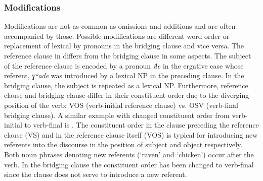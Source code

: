\documentclass[output=paper]{LSP/langsci}
\begin{document}
\subsubsection{Modifications}
\label{ssec:Modifications}
Modifications are not as common as omissions and additions and are often accompanied by those. Possible modifications are different word order or replacement of lexical  by pronouns in the bridging clause and vice versa. The reference clause in  differs from the bridging clause in some aspects. The subject of the reference clause is encoded by a pronoun \textit{iɬe} in the ergative case whose referent, \textit{ɣʷade}  was introduced by a lexical NP in the preceding clause. In the bridging clause, the subject is repeated as a lexical NP. Furthermore, reference clause and bridging clause differ in their constituent order due to the diverging position of the verb: VOS (verb-initial reference clause) vs. OSV (verb-final bridging clause). A similar example with changed constituent order from verb-initial to verb-final is .  The constituent order in the clause preceding the reference clause (VS) and in the reference clause itself (VOS) is typical for introducing new referents into the discourse in the position of subject and object respectively. Both noun phrases denoting new referents (`raven' and `chicken') occur after the verb. In the bridging clause the constituent order has been changed to verb-final since the clause does not serve to introduce a new referent.
\end{document}

